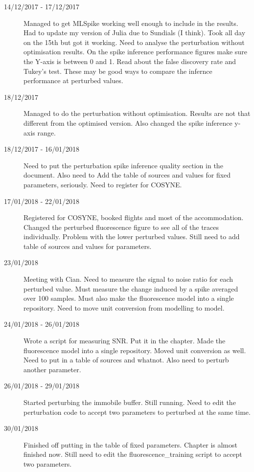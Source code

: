 \documentclass[a4paper,12pt]{article}
\theoremstyle{definition}
\begin{document}
\begin{description}
  \item[14/12/2017 - 17/12/2017] Managed to get MLSpike working well enough to include in the results. Had to update my version of Julia due to Sundials (I think). Took all day on the 15th but got it working. Need to analyse the perturbation without optimisation results. On the spike inference performance figures make sure the Y-axis is between 0 and 1. Read about the false discovery rate and Tukey's test. These may be good ways to compare the infernce performance at perturbed values.

  \item[18/12/2017] Managed to do the perturbation without optimisation. Results are not that different from the optimised version. Also changed the spike inference y-axis range.

  \item[18/12/2017 - 16/01/2018] Need to put the perturbation spike inference quality section in the document. Also  need to Add the table of sources and values for fixed parameters, seriously. Need to register for COSYNE.

	\item[17/01/2018 - 22/01/2018] Registered for COSYNE, booked flights and most of the accommodation. Changed the perturbed fluorescence figure to see all of the traces individually. Problem with the lower perturbed values. Still need to add table of sources and values for parameters.

	\item[23/01/2018] Meeting with Cian. Need to measure the signal to noise ratio for each perturbed value. Must measure the change induced by a spike averaged over 100 samples. Must also make the fluorescence model into a single repository. Need to move unit conversion from modelling to model.

	\item[24/01/2018 - 26/01/2018] Wrote a script for measuring SNR. Put it in the chapter. Made the fluorescence model into a single repository. Moved unit conversion as well. Need to put in a table of sources and whatnot. Also need to perturb another parameter.

	\item[26/01/2018 - 29/01/2018] Started perturbing the immobile buffer. Still running. Need to edit the perturbation code to accept two parameters to perturbed at the same time.

	\item[30/01/2018] Finished off putting in the table of fixed parameters. Chapter is almost finished now. Still need to edit the fluorescence\_training script to accept two parameters.


\end{description}
\end{document}
